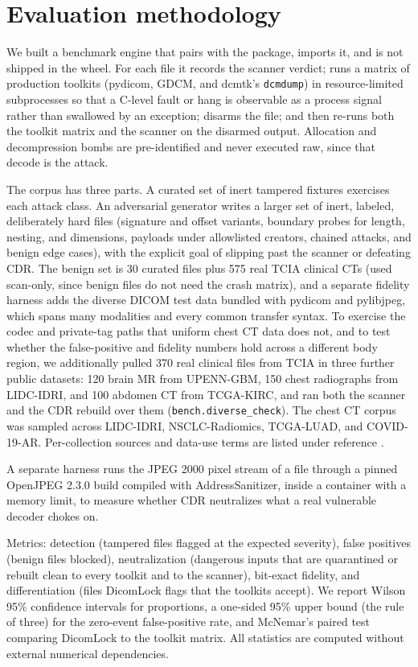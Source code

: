 \documentclass[11pt]{article}
\begin{document}
\section{Evaluation methodology}

We built a benchmark engine that pairs with the package, imports it, and is not shipped in the wheel. For each file it records the scanner verdict; runs a matrix of production toolkits (pydicom, GDCM, and dcmtk's \verb|dcmdump|) in resource-limited subprocesses so that a C-level fault or hang is observable as a process signal rather than swallowed by an exception; disarms the file; and then re-runs both the toolkit matrix and the scanner on the disarmed output. Allocation and decompression bombs are pre-identified and never executed raw, since that decode is the attack.

The corpus has three parts. A curated set of inert tampered fixtures exercises each attack class. An adversarial generator writes a larger set of inert, labeled, deliberately hard files (signature and offset variants, boundary probes for length, nesting, and dimensions, payloads under allowlisted creators, chained attacks, and benign edge cases), with the explicit goal of slipping past the scanner or defeating CDR. The benign set is 30 curated files plus 575 real TCIA clinical CTs (used scan-only, since benign files do not need the crash matrix), and a separate fidelity harness adds the diverse DICOM test data bundled with pydicom and pylibjpeg, which spans many modalities and every common transfer syntax. To exercise the codec and private-tag paths that uniform chest CT data does not, and to test whether the false-positive and fidelity numbers hold across a different body region, we additionally pulled 370 real clinical files from TCIA in three further public datasets: 120 brain MR from UPENN-GBM, 150 chest radiographs from LIDC-IDRI, and 100 abdomen CT from TCGA-KIRC, and ran both the scanner and the CDR rebuild over them (\verb|bench.diverse_check|). The chest CT corpus was sampled across LIDC-IDRI, NSCLC-Radiomics, TCGA-LUAD, and COVID-19-AR. Per-collection sources and data-use terms are listed under reference \cite{ref24}.

A separate harness runs the JPEG 2000 pixel stream of a file through a pinned OpenJPEG 2.3.0 build compiled with AddressSanitizer, inside a container with a memory limit, to measure whether CDR neutralizes what a real vulnerable decoder chokes on.

Metrics: detection (tampered files flagged at the expected severity), false positives (benign files blocked), neutralization (dangerous inputs that are quarantined or rebuilt clean to every toolkit and to the scanner), bit-exact fidelity, and differentiation (files DicomLock flags that the toolkits accept). We report Wilson 95\% confidence intervals for proportions, a one-sided 95\% upper bound (the rule of three) for the zero-event false-positive rate, and McNemar's paired test comparing DicomLock to the toolkit matrix. All statistics are computed without external numerical dependencies.
\end{document}
